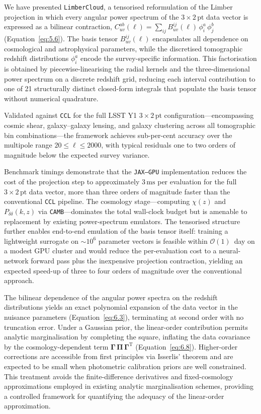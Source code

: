 We have presented \texttt{LimberCloud}, a tensorised reformulation of the Limber projection in which every angular power spectrum of the \(3\times2\,\mathrm{pt}\) data vector is expressed as a bilinear contraction, \(C_{uv}^{ab}(\ell) = \sum_{ij} B_{uv}^{ij}(\ell)\,\phi^a_i\,\phi^b_j\) (Equation~\ref{eq:5.6}). The basis tensor \(B_{uv}^{ij}(\ell)\) encapsulates all dependence on cosmological and astrophysical parameters, while the discretised tomographic redshift distributions \(\phi^a_i\) encode the survey-specific information. This factorisation is obtained by piecewise-linearising the radial kernels and the three-dimensional power spectrum on a discrete redshift grid, reducing each interval contribution to one of 21 structurally distinct closed-form integrals that populate the basis tensor without numerical quadrature.

Validated against \texttt{CCL} for the full LSST Y1 \(3\times2\,\mathrm{pt}\) configuration---encompassing cosmic shear, galaxy--galaxy lensing, and galaxy clustering across all tomographic bin combinations---the framework achieves sub-per-cent accuracy over the multipole range \(20 \le \ell \le 2000\), with typical residuals one to two orders of magnitude below the expected survey variance.

Benchmark timings demonstrate that the \texttt{JAX--GPU} implementation reduces the cost of the projection step to approximately \(3\,\mathrm{ms}\) per evaluation for the full \(3\times2\,\mathrm{pt}\) data vector, more than three orders of magnitude faster than the conventional \texttt{CCL} pipeline. The cosmology stage---computing \(\chi(z)\) and \(P_{\delta\delta}(k,z)\) via \texttt{CAMB}---dominates the total wall-clock budget but is amenable to replacement by existing power-spectrum emulators. The tensorised structure further enables end-to-end emulation of the basis tensor itself: training a lightweight surrogate on \(\sim\!10^6\) parameter vectors is feasible within \(\mathcal{O}(1)\)~day on a modest GPU cluster and would reduce the per-evaluation cost to a neural-network forward pass plus the inexpensive projection contraction, yielding an expected speed-up of three to four orders of magnitude over the conventional approach.

The bilinear dependence of the angular power spectra on the redshift distributions yields an exact polynomial expansion of the data vector in the nuisance parameters (Equation~\ref{eq:6.3}), terminating at second order with no truncation error. Under a Gaussian prior, the linear-order contribution permits analytic marginalisation by completing the square, inflating the data covariance by the cosmology-dependent term \(\boldsymbol{\Gamma} \, \boldsymbol{\Pi} \, \boldsymbol{\Gamma}^{\mathrm{T}}\) (Equation~\ref{eq:6.8}). Higher-order corrections are accessible from first principles via Isserlis' theorem and are expected to be small when photometric calibration priors are well constrained. This treatment avoids the finite-difference derivatives and fixed-cosmology approximations employed in existing analytic marginalisation schemes, providing a controlled framework for quantifying the adequacy of the linear-order approximation.

